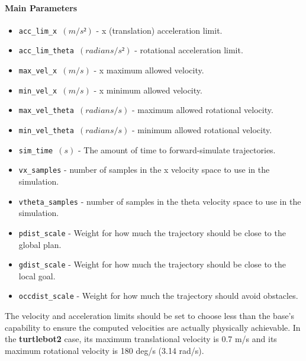 \documentclass[12pt]{article}
\begin{document}
\paragraph{Main Parameters}
\begin{itemize}[label={}]
    \item \texttt{acc\_lim\_x $(m/s²)$} - x (translation) acceleration limit.
    \item \texttt{acc\_lim\_theta $(radians/s²)$} - rotational acceleration limit.
    \item \texttt{max\_vel\_x $(m/s)$} - x maximum allowed velocity.
    \item \texttt{min\_vel\_x $(m/s)$} - x minimum allowed velocity.
    \item \texttt{max\_vel\_theta $(radians/s)$} - maximum allowed rotational  velocity.
    \item \texttt{min\_vel\_theta $(radians/s)$} - minimum allowed rotational velocity.
    \item \texttt{sim\_time $(s)$} - The amount of time to forward-simulate trajectories.
    \item \texttt{vx\_samples} - number of samples in the x velocity space to use in the simulation.
    \item \texttt{vtheta\_samples} - number of samples in the theta velocity space to use in the simulation.
    \item \texttt{pdist\_scale} - Weight for how much the trajectory should be close to the global plan.
    \item \texttt{gdist\_scale} - Weight for how much the trajectory should be close to the local goal.
    \item \texttt{occdist\_scale} - Weight for how much the trajectory should avoid obstacles.
\end{itemize}

The velocity and acceleration limits should be set to choose  less than the base's capability to ensure the computed velocities are actually physically achievable. In the \textbf{turtlebot2} case, its maximum  translational velocity is 0.7 m/s and its maximum rotational velocity is 180 deg/s (3.14 rad/s).
\end{document}
